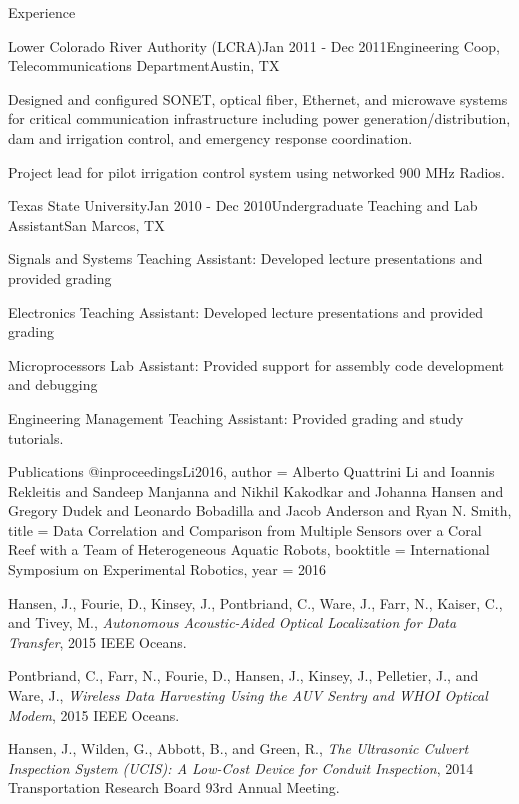 \documentclass{resume} %
\begin{document}
\begin{rSection}{Experience}
\hfill \break

\begin{rSubsection}{Lower Colorado River Authority (LCRA)}{Jan 2011 - Dec 2011}{Engineering Coop, Telecommunications Department}{Austin, TX}
\item{Designed and configured SONET, optical fiber, Ethernet, and microwave systems for critical communication infrastructure including power generation/distribution, dam and 
            irrigation control, and emergency response coordination. }
\item{Project lead for pilot irrigation control system using networked 900 MHz Radios.}
\end{rSubsection}

\begin{rSubsection}{Texas State University}{Jan 2010 - Dec 2010}{Undergraduate Teaching and Lab Assistant}{San Marcos, TX}
\item{Signals and Systems Teaching Assistant: Developed lecture presentations and provided grading}
\item{Electronics Teaching Assistant: Developed lecture presentations and provided grading}
\item{Microprocessors Lab Assistant: Provided support for assembly code development and debugging}
\item{Engineering Management Teaching Assistant: Provided grading and study tutorials.}
\end{rSubsection}
\end{rSection}


\begin{rSection}{Publications}
@inproceedings{Li2016,
          author = {Alberto Quattrini Li and Ioannis Rekleitis and Sandeep Manjanna and Nikhil Kakodkar and Johanna Hansen and Gregory Dudek and Leonardo Bobadilla and Jacob Anderson and Ryan N. Smith},
            title = {Data Correlation and Comparison from Multiple Sensors over a Coral Reef with a Team of Heterogeneous Aquatic Robots},
              booktitle = {International Symposium on Experimental Robotics},
                year = {2016}
            }
                
Hansen, J., Fourie, D., Kinsey, J., Pontbriand, C., Ware, J., Farr, N., Kaiser, C., and Tivey, M., \textit{Autonomous Acoustic-Aided Optical Localization for Data Transfer}, 2015 IEEE Oceans.

Pontbriand, C., Farr, N., Fourie, D., Hansen, J.,  Kinsey, J., Pelletier, J., and Ware, J., 
 \textit{Wireless Data Harvesting Using the AUV Sentry and WHOI Optical Modem}, 2015 IEEE Oceans.

Hansen, J., Wilden, G., Abbott, B., and Green, R., \textit{The Ultrasonic Culvert
Inspection System (UCIS): A Low-Cost Device for Conduit Inspection}, 2014 Transportation
Research Board 93rd Annual Meeting. 
\end{rSection}
\end{document}
